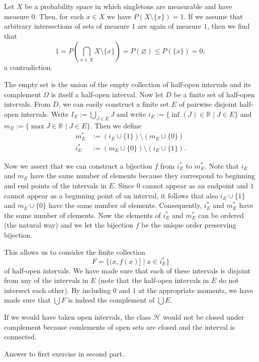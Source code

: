 \documentclass{article}
\begin{document}
\begin{ex}
Let $X$ be a probability space in which singletons are measurable and have measure $0$. Then, for each $x\in X$ we have $P(X\setminus\{x\})=1$. If we assume that arbitrary intersections of sets of measure $1$ are again of measure $1$, then we find that
\begin{equation*}\textstyle
1=P(\bigcap_{x\in X}X\setminus\{x\})=P(\varnothing)\leq P(\{x\})=0,
\end{equation*}
a contradiction.
\end{ex}

\begin{ex}
The empty set is the union of the empty collection of half-open intervals and its complement $\Omega$ is itself a half-open interval. Now let $D$ be a finite set of half-open intervals. From $D$, we
can easily construct a finite set $E$ of pairwise disjoint half-open intervals. 
Write $I_E:=\bigcup_{J\in E} J$ and write $i_E:=\{\inf(J)\in\mathbb{R}\mid J\in E\}$ and $m_E:=\{\max J\in\mathbb{R}\mid J\in E\}$. Then we define 
\begin{align*}
m_E^\ast & :=(i_E\cup\{1\})\setminus (m_E\cup\{0\})\\
i_E^\ast & :=(m_E\cup\{0\})\setminus (i_E\cup\{1\}).
\end{align*} 

Now we assert that we can construct a bijection $f$ from $i_E^\ast$ to $m_E^\ast$. Note that $i_E$ and $m_E$ have the same number of elements because they correspond to beginning and end points of the intervals in $E$. Since $0$ cannot appear as an endpoint and $1$ cannot appear as a beginning point of an interval, it follows that also $i_E\cup\{1\}$ and $m_E\cup\{0\}$ have the same number of elements. Consequently, $i_E^\ast$ and $m_E^\ast$ have the same number of elements. Now the elements of $i_E^\ast$ and $m_E^\ast$ can be ordered (the natural way) and we let the bijection $f$ be the unique order preserving bijection.

This allows us to consider the finite collection
\begin{equation*}
F=\{(x,f(x)]\mid x\in i_E^\ast\}
\end{equation*}
of half-open intervals. We have made sure that each of these intervals is disjoint from any of the intervals in $E$ (note that the half-open intervals in $E$ do not intersect each other). By including $0$ and $1$ at the appropriate moments, we have made sure that $\bigcup F$ is indeed the complement of $\bigcup E$.

If we would have taken open intervals, the class $\mathcal{H}$ would not be closed under complement because comlements of open sets are closed and the interval is connected.
\end{ex}

\begin{ex}

\end{ex}

\setcounter{ex}{0}

\begin{ex}
Answer to first exercise in second part.
\end{ex}
\end{document}
